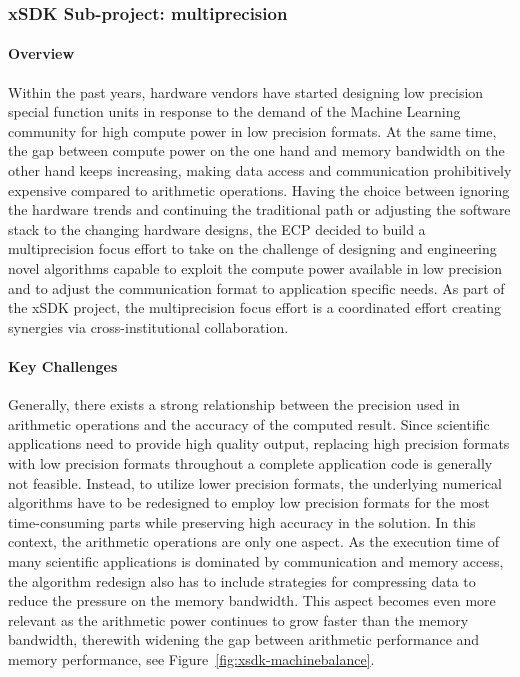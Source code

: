 \subsubsection{ xSDK Sub-project: multiprecision} 
\paragraph{Overview} 
Within the past years, hardware vendors have started designing low precision special function units 
in response to the demand of the Machine Learning community for high compute power
in low precision formats. At the same time, the gap between compute power
on the one hand and memory bandwidth on the other hand keeps increasing, 
making data access and communication prohibitively expensive compared to arithmetic operations.
Having the choice between ignoring the hardware trends and continuing the traditional path
or adjusting the software stack to the changing hardware designs, the ECP
decided to build a multiprecision focus effort to take on the challenge of designing and engineering novel algorithms capable to exploit the compute power available in low precision and to adjust the communication format to application specific needs.
As part of the xSDK project, the multiprecision focus effort is a coordinated effort creating synergies via cross-institutional collaboration.

\paragraph{Key Challenges}
Generally, there exists a strong relationship between the precision used in arithmetic operations and the accuracy of the computed result. Since scientific applications need to provide high quality output, replacing high precision formats with low precision formats throughout a complete application code is generally not feasible. Instead, to utilize lower precision formats, the underlying numerical algorithms have to be redesigned to employ low precision formats for the most time-consuming parts while preserving  high accuracy in the solution. In this context, the arithmetic operations are only one aspect. As the execution time of many scientific applications is dominated by communication and memory access, the algorithm redesign also has to include strategies for compressing data to reduce the pressure on the memory bandwidth. This aspect becomes even more relevant as the arithmetic power continues to grow faster than the memory bandwidth, therewith widening the gap between arithmetic performance and memory performance, see Figure~\ref{fig:xsdk-machinebalance}.

